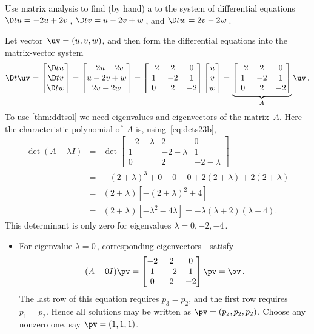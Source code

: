 \begin{example} \label{eg:de3t} 
Use matrix analysis to find (by hand) a  to the system of differential equations \(\D tu=-2u+2v\)\,, \(\D tv=u-2v+w\)\,, and \(\D tw=2v-2w\)\,.

\begin{solution} 
Let vector~\(\uv=(u,v,w)\), and then form the differential equations into the matrix-vector system
\begin{equation*}
\D t\uv=\begin{bmatrix} \D tu\\\D tv\\\D t w \end{bmatrix}
=\begin{bmatrix} -2u+2v\\u-2v+w\\2v-2w \end{bmatrix}
=\begin{bmatrix} -2&2&0\\1&-2&1\\0&2&-2 \end{bmatrix}
\begin{bmatrix} u\\v\\w \end{bmatrix}
=\underbrace{\begin{bmatrix} -2&2&0\\1&-2&1\\0&2&-2 \end{bmatrix}}_A\uv\,.
\end{equation*}
To use \cref{thm:ddtsol} we need eigenvalues and eigenvectors of the matrix~\(A\).
Here the characteristic polynomial of~\(A\) is, using~\eqref{eq:dets23b},
\begin{eqnarray*}
\det(A-\lambda I)&=&\det\begin{bmatrix} -2-\lambda&2&0\\1&-2-\lambda&1\\0&2&-2-\lambda \end{bmatrix}
\\&=&-(2+\lambda)^3+0+0-0+2(2+\lambda)+2(2+\lambda)
\\&=&(2+\lambda)\left[-(2+\lambda)^2+4\right]
\\&=&(2+\lambda)[-\lambda^2-4\lambda]
=-\lambda(\lambda+2)(\lambda+4).
\end{eqnarray*}
This determinant is only zero for eigenvalues \(\lambda=0,-2,-4\)\,.
\begin{itemize}
\item For eigenvalue \(\lambda=0\)\,, corresponding eigenvectors~\pv\ satisfy
\begin{equation*}
(A-0I)\pv=\begin{bmatrix} -2&2&0\\1&-2&1\\0&2&-2 \end{bmatrix}\pv=\ov\,.
\end{equation*}
The last row of this equation requires \(p_3=p_2\), and the first row requires \(p_1=p_2\).
Hence all solutions may be written as \(\pv=(p_2,p_2,p_2)\).
Choose any nonzero one, say \(\pv=(1,1,1)\).


\end{itemize}
\end{solution}
\end{example}
